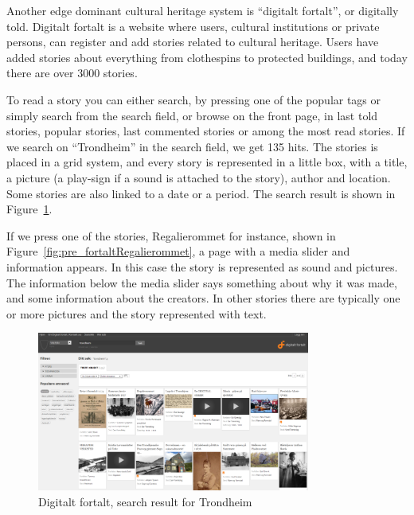 \documentclass[11pt]{book}
\begin{document}
Another edge dominant cultural heritage system is ``digitalt fortalt'', or digitally told. Digitalt fortalt is a website where users, cultural institutions or private persons, can register and add stories related to cultural heritage. Users have added stories about everything from clothespins to protected buildings, and today there are over 3000 stories. 

To read a story you can either search, by pressing one of the popular tags or simply search from the search field, or browse on the front page, in last told stories, popular stories, last commented stories or among the most  read stories. If we search on ``Trondheim'' in the search field, we get 135 hits. The stories is placed in a grid system, and every story is represented in a little box, with a title, a picture (a play-sign if a sound is attached to the story), author and location. Some stories are also linked to a date or a period. The search result is shown in Figure~\ref{fig:pre_fortaltTrondheim}.

If we press one of the stories, Regalierommet for instance, shown in Figure~\ref{fig:pre_fortaltRegalierommet}, a page with a media slider and information appears. In this case the story is represented as sound and pictures. The information below the media slider says something about why it was made, and some information about the creators. In other stories there are typically one or more pictures and the story represented with text.

\begin{figure}[H]
      \centering
      \includegraphics[width=0.8\textwidth]{Figures/Prestudy/digitaltfortaltSokTrondheim.png}
      \caption{ Digitalt fortalt, search result for Trondheim}
      \label{fig:pre_fortaltTrondheim}
\end{figure}
\end{document}
